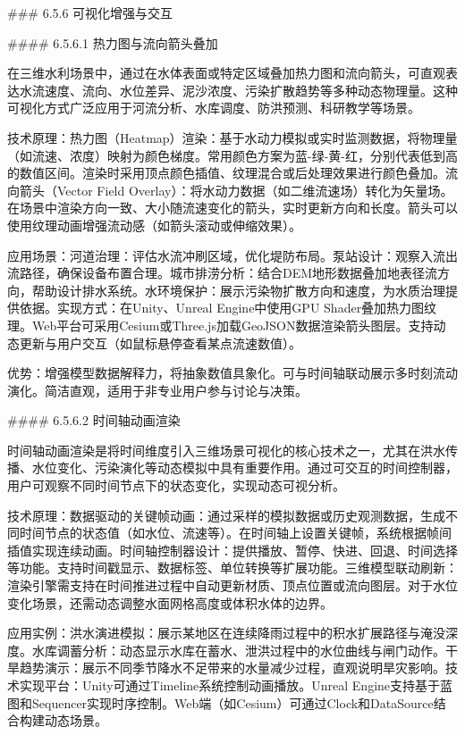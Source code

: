 \#\#\# 6.5.6 可视化增强与交互

\#\#\#\# 6.5.6.1 热力图与流向箭头叠加

在三维水利场景中，通过在水体表面或特定区域叠加热力图和流向箭头，可直观表达水流速度、流向、水位差异、泥沙浓度、污染扩散趋势等多种动态物理量。这种可视化方式广泛应用于河流分析、水库调度、防洪预测、科研教学等场景。

技术原理：热力图（Heatmap）渲染：基于水动力模拟或实时监测数据，将物理量（如流速、浓度）映射为颜色梯度。常用颜色方案为蓝-绿-黄-红，分别代表低到高的数值区间。渲染时采用顶点颜色插值、纹理混合或后处理效果进行颜色叠加。流向箭头（Vector Field Overlay）：将水动力数据（如二维流速场）转化为矢量场。在场景中渲染方向一致、大小随流速变化的箭头，实时更新方向和长度。箭头可以使用纹理动画增强流动感（如箭头滚动或伸缩效果）。

应用场景：河道治理：评估水流冲刷区域，优化堤防布局。泵站设计：观察入流出流路径，确保设备布置合理。城市排涝分析：结合DEM地形数据叠加地表径流方向，帮助设计排水系统。水环境保护：展示污染物扩散方向和速度，为水质治理提供依据。实现方式：在Unity、Unreal Engine中使用GPU Shader叠加热力图纹理。Web平台可采用Cesium或Three.js加载GeoJSON数据渲染箭头图层。支持动态更新与用户交互（如鼠标悬停查看某点流速数值）。

优势：增强模型数据解释力，将抽象数值具象化。可与时间轴联动展示多时刻流动演化。简洁直观，适用于非专业用户参与讨论与决策。

\#\#\#\# 6.5.6.2 时间轴动画渲染

时间轴动画渲染是将时间维度引入三维场景可视化的核心技术之一，尤其在洪水传播、水位变化、污染演化等动态模拟中具有重要作用。通过可交互的时间控制器，用户可观察不同时间节点下的状态变化，实现动态可视分析。

技术原理：数据驱动的关键帧动画：通过采样的模拟数据或历史观测数据，生成不同时间节点的状态值（如水位、流速等）。在时间轴上设置关键帧，系统根据帧间插值实现连续动画。时间轴控制器设计：提供播放、暂停、快进、回退、时间选择等功能。支持时间戳显示、数据标签、单位转换等扩展功能。三维模型联动刷新：渲染引擎需支持在时间推进过程中自动更新材质、顶点位置或流向图层。对于水位变化场景，还需动态调整水面网格高度或体积水体的边界。

应用实例：洪水演进模拟：展示某地区在连续降雨过程中的积水扩展路径与淹没深度。水库调蓄分析：动态显示水库在蓄水、泄洪过程中的水位曲线与闸门动作。干旱趋势演示：展示不同季节降水不足带来的水量减少过程，直观说明旱灾影响。技术实现平台：Unity可通过Timeline系统控制动画播放。Unreal Engine支持基于蓝图和Sequencer实现时序控制。Web端（如Cesium）可通过Clock和DataSource结合构建动态场景。

